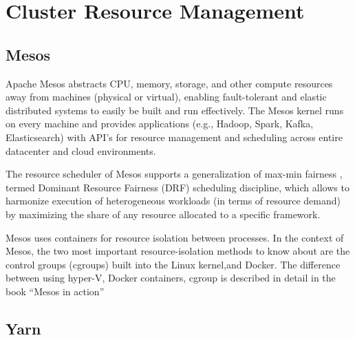 \section{Cluster Resource Management}
\label{S:o-cluster}


\subsection{Mesos}

     Apache Mesos \cite{www-mesos} abstracts CPU, memory,
     storage, and other compute resources away from machines (physical
     or virtual), enabling fault-tolerant and elastic distributed
     systems to easily be built and run effectively. The Mesos kernel
     runs on every machine and provides applications (e.g., Hadoop,
     Spark, Kafka, Elasticsearch) with API’s for resource management
     and scheduling across entire datacenter and cloud environments.

     The resource scheduler of Mesos supports a generalization of
     max-min fairness \cite{paper-mesos-Abu-Dbai-2016}, termed Dominant
     Resource Fairness (DRF) \cite{paper-mesos-ghodsi2011dominant}
     scheduling discipline, which allows to harmonize execution of
     heterogeneous workloads (in terms of resource demand) by
     maximizing the share of any resource allocated to a specific
     framework.
     
     Mesos uses containers for resource isolation between
     processes. In the context of Mesos, the two most important
     resource-isolation methods to know about are the control groups
     (cgroups) built into the Linux kernel,and Docker. The difference
     between using hyper-V, Docker containers, cgroup is described in
     detail in the book ``Mesos in action'' \cite{book-mesos-Ignazio-2016}


\subsection{Yarn \cv}


